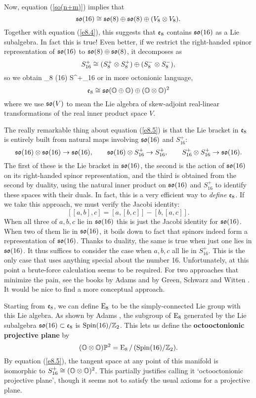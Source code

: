 Now, equation (\ref{so(n+m)}) implies that
\[     {\mathfrak {so}}(16) \cong {\mathfrak {so}}(8) \oplus {\mathfrak {so}}(8) \oplus (V_8 \otimes V_8) .\]
Together with equation (\ref{e8.4}), this suggests that ${\mathfrak {e}}_8$ contains
${\mathfrak {so}}(16)$ as a Lie subalgebra. In fact this is true!  Even better, if we
restrict the right-handed spinor representation of ${\mathfrak {so}}(16)$ to ${\mathfrak {so}}(8)
\oplus {\mathfrak {so}}(8)$, it decomposes as
\[    S^+_{16} \cong (S_8^+ \otimes S_8^+) \oplus (S_8^- \otimes S_8^-),\]
so we obtain
\be   \e_8 \iso \so(16) \oplus S^+_{16}     \label{e8.5} \ee   
or in more octonionic language,
\[   
{\mathfrak {e}}_8 \cong {\mathfrak {so}}({\mathbb O} \oplus {\mathbb O}) \oplus ({\mathbb O} \otimes {\mathbb O})^2 
\label{e8.6} \]   
where we use ${\mathfrak {so}}(V)$ to mean the Lie algebra of skew-adjoint real-linear
transformations of the real inner product space $V$.  

The really remarkable thing about equation (\ref{e8.5}) is that the Lie
bracket in ${\mathfrak {e}}_8$ is entirely built from natural maps involving
${\mathfrak {so}}(16)$ and $S^+_{16}$:  
\[         {\mathfrak {so}}(16) \otimes {\mathfrak {so}}(16) \to {\mathfrak {so}}(16) , \qquad   
           {\mathfrak {so}}(16) \otimes S^+_{16} \to S^+_{16}  , \qquad   
           S^+_{16} \otimes S^+_{16} \to {\mathfrak {so}}(16) .\]   
The first of these is the Lie bracket in ${\mathfrak {so}}(16)$, the second is the
action of ${\mathfrak {so}}(16)$ on its right-handed spinor representation, and the
third is obtained from the second by duality, using the natural inner
product on ${\mathfrak {so}}(16)$ and $S^+_{16}$ to identify these spaces with their
duals.   In fact, this is a very efficient way to {\it define} ${\mathfrak {e}}_8$. 
If we take this approach, we must verify the Jacobi identity:   
\[       [[a,b],c] = [a,[b,c]] - [b,[a,c]]  .\]   
When all three of $a,b,c$ lie in ${\mathfrak {so}}(16)$ this is just the Jacobi   
identity for ${\mathfrak {so}}(16)$.   When two of them lie in ${\mathfrak {so}}(16)$, it boils   
down to fact that spinors indeed form a representation of ${\mathfrak {so}}(16)$.   
Thanks to duality, the same is true when just one lies in ${\mathfrak {so}}(16)$.  It
thus suffices to consider the case when $a,b,c$ all lie in $S_{16}^+$. 
This is the only case that uses anything special about the number 16. 
Unfortunately, at this point a brute-force calculation seems to be
required.  For two approaches that minimize the pain, see the books by
Adams \cite{Adams} and by Green, Schwarz and Witten \cite{GSW}.   It
would be nice to find a more conceptual approach.
   
Starting from ${\mathfrak {e}}_8$, we can define ${\rm E}_8$ to be the simply-connected
Lie group with this Lie algebra.  As shown by Adams \cite{Adams}, the 
subgroup of ${\rm E}_8$ generated by the Lie subalgebra ${\mathfrak {so}}(16) \subset
{\mathfrak {e}}_8$ is ${\rm Spin}(16)/{\mathbb Z}_2$.  This lets us define the {\bf octooctonionic
projective plane} by  
\[            ({\mathbb O} \otimes {\mathbb O}){\mathbb P}^2 = {\rm E}_8\,/\,({\rm Spin}(16)/{\mathbb Z}_2) . \]  
By equation (\ref{e8.5}), the tangent space at any point 
of this manifold is isomorphic to $S_{16}^+ \cong ({\mathbb O} \otimes {\mathbb O})^2$.
This partially justifies calling it `octooctonionic projective plane',
though it seems not to satisfy the usual axioms for a projective plane.

